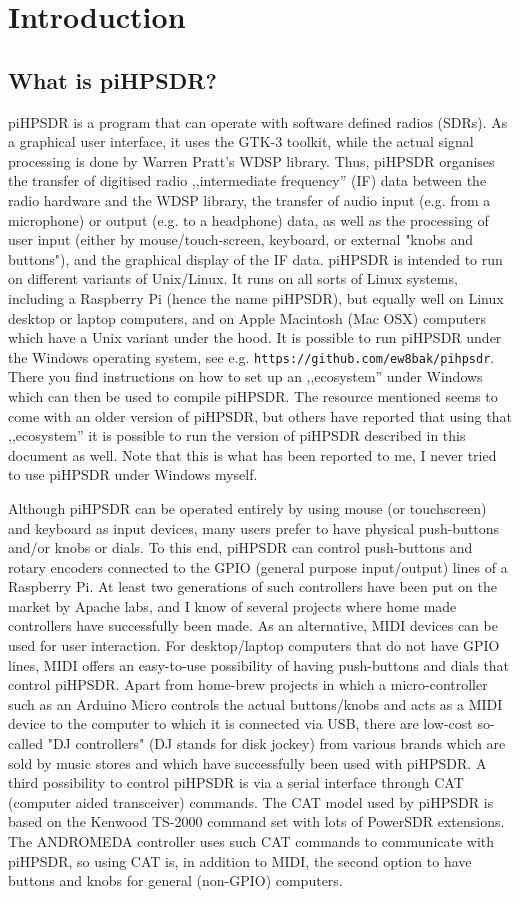 \documentclass[12pt]{book}
\def\pH{pi\-HPSDR\xspace}
\begin{document}
\chapter{Introduction}
\section{What is \pH?}
\pH is a program that can operate with software defined radios (SDRs). As a graphical user interface,
it uses the GTK-3 toolkit, while the actual signal processing is done by Warren Pratt's WDSP library. Thus,
\pH organises the transfer of digitised radio ,,intermediate frequency'' (IF)
data between the radio hardware and the
WDSP library, the
transfer of audio input (e.g. from a microphone) or output (e.g. to a headphone) data,
as well as the processing of user
input (either by mouse/touch-screen, keyboard, or external "knobs and buttons"),
and the graphical display of the IF data. \pH is intended
to run on different variants of Unix/Linux. It runs on all sorts of Linux systems,
including a Raspberry Pi (hence
the name \pH), but equally well on Linux desktop or laptop computers, and on Apple Macintosh (Mac OSX)
computers which have a Unix variant under the hood.
It is possible to run
\pH under the Windows operating system, see e.g. \texttt{https://github.com/ew8bak/pihpsdr}.
There you find instructions on how to set up an ,,ecosystem'' under Windows which can then be used to compile
\pH. The resource mentioned seems to come with an older version of \pH, but others have reported
that using that ,,ecosystem'' it is possible to run the version of \pH described in this document
as well. Note that this is what has been reported to me, I never tried to use \pH under Windows
myself.


Although \pH can be operated entirely by using mouse (or touchscreen)
and keyboard as input devices, many users prefer to
have physical push-buttons and/or knobs or dials. To this end, \pH can control push-buttons and rotary
encoders connected to the GPIO (general purpose input/output)
lines of a Raspberry Pi. At least two generations of such controllers have
been put on the market by Apache labs, and I know of several projects where home made controllers have
successfully been made. As an alternative, MIDI devices can be used for user interaction. For desktop/laptop
computers that do not have GPIO lines, MIDI offers an easy-to-use possibility of having push-buttons and
dials that control \pH. Apart from home-brew projects in which a micro-controller such as an Arduino
Micro controls the actual buttons/knobs and acts as a MIDI device to the computer to which it is connected
via USB, there are low-cost so-called "DJ controllers" (DJ stands for disk jockey) from various brands
which are sold by music stores and
which
have successfully been used with \pH. A third possibility to control \pH is via a serial interface
through CAT (computer aided transceiver) commands. The CAT model used by \pH is based on the Kenwood
TS-2000 command set with lots of PowerSDR extensions. The ANDROMEDA controller uses such CAT commands to
communicate with \pH, so using CAT is, in addition to MIDI, the second option to have buttons and knobs
for general (non-GPIO) computers.
\end{document}
